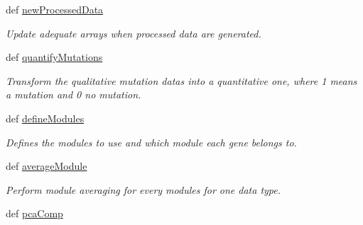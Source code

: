\begin{DoxyCompactItemize}
\item 
\hypertarget{classnavicom_1_1navicom_1_1NaviCom_a42c3198667c80bbf3d61a3d57b39a883}{
def \hyperlink{classnavicom_1_1navicom_1_1NaviCom_a42c3198667c80bbf3d61a3d57b39a883}{newProcessedData}}
\label{classnavicom_1_1navicom_1_1NaviCom_a42c3198667c80bbf3d61a3d57b39a883}

\begin{DoxyCompactList}\small\item\em Update adequate arrays when processed data are generated. \item\end{DoxyCompactList}\item 
def \hyperlink{classnavicom_1_1navicom_1_1NaviCom_a5314c49d6b9749693519a4a86cbfde71}{quantifyMutations}
\begin{DoxyCompactList}\small\item\em Transform the qualitative mutation datas into a quantitative one, where 1 means a mutation and 0 no mutation. \item\end{DoxyCompactList}\item 
def \hyperlink{classnavicom_1_1navicom_1_1NaviCom_a6411b52971f15bd11270942cb98eaa1a}{defineModules}
\begin{DoxyCompactList}\small\item\em Defines the modules to use and which module each gene belongs to. \item\end{DoxyCompactList}\item 
\hypertarget{classnavicom_1_1navicom_1_1NaviCom_afd1a299b687bc97e171cff0a738b7b73}{
def \hyperlink{classnavicom_1_1navicom_1_1NaviCom_afd1a299b687bc97e171cff0a738b7b73}{averageModule}}
\label{classnavicom_1_1navicom_1_1NaviCom_afd1a299b687bc97e171cff0a738b7b73}

\begin{DoxyCompactList}\small\item\em Perform module averaging for every modules for one data type. \item\end{DoxyCompactList}\item 
\hypertarget{classnavicom_1_1navicom_1_1NaviCom_a369bba5d2dc39a565880bc6f853f0da1}{
def \hyperlink{classnavicom_1_1navicom_1_1NaviCom_a369bba5d2dc39a565880bc6f853f0da1}{pcaComp}}
\label{classnavicom_1_1navicom_1_1NaviCom_a369bba5d2dc39a565880bc6f853f0da1}


\end{DoxyCompactItemize}
